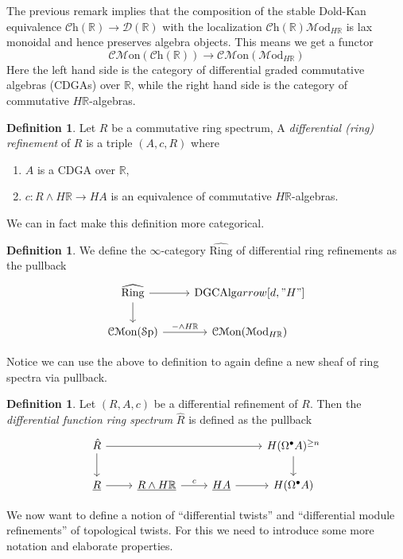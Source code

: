 \documentclass[a4paper]{book}
\newcommand{\lC}{\mathcal{C}}
\newcommand{\lD}{\mathcal{D}}
\newcommand{\lM}{\mathcal{M}}
\newcommand{\bR}{\mathbb{R}}
\newcommand{\lS}{\mathcal{S}}
\newcommand{\Sp}{\lS\mathrm{p}} %
\newcommand{\Mon}{\lM\mathrm{on}} %
\newcommand{\CMon}{\lC\Mon} %
\newcommand{\Ch}{\lC\mathrm{h}} %
\newcommand{\Mod}{\lM\mathrm{od}} %
\theoremstyle{definition}
\newtheorem{definition}[equation]{Definition}
\theoremstyle{remark}
\numberwithin{equation}{section}
\begin{document}
The previous remark implies that the composition of the stable Dold-Kan equivalence $\Ch(\bR) \to \lD(\bR)$ with the localization $\Ch(\bR) \Mod_{H\bR}$ is lax monoidal and hence preserves algebra objects. This means we get a functor
\[\CMon(\Ch(\bR)) \to \CMon(\Mod_{H\bR}) \]
Here the left hand side is the category of differential graded commutative algebras (CDGAs) over $\bR$, while the right hand side is the category of commutative $H\bR$-algebras.

\begin{definition}
  Let $R$ be a commutative ring spectrum, A \emph{differential (ring) refinement} of $R$ is a triple $(A, c, R)$ where
  \begin{enumerate}
    \item $A$ is a CDGA over $\bR$,
    \item $c\colon R \wedge H\bR \to HA$ is an equivalence of commutative $H\bR$-algebras.
  \end{enumerate}
\end{definition}

We can in fact make this definition more categorical.

\begin{definition}
  We define the $\infty$-category $\widehat{\mathrm{Ring}}$ of differential ring refinements as the pullback
  \[
  \begin{tikzcd}
    \widehat{\mathrm{Ring}} \arrow[r] \arrow[d] & \mathrm{DGCAlg} arrow[d, "H"] \\
    \CMon(\Sp) \arrow[r, " - \wedge H\bR"] & \CMon(\Mod_{H\bR})
  \end{tikzcd}
  \]
\end{definition}

Notice we can use the above to definition to again define a new sheaf of ring spectra via pullback.

\begin{definition}
  Let $(R,A,c)$ be a differential refinement of $R$. Then the \emph{differential function ring spectrum} $\hat{R}$ is defined as the pullback
  \[
  \begin{tikzcd}
    \hat{R} \arrow[d] \arrow[rrr] & & & H(\Omega^\bullet A)^{\geq n} \arrow[d] \\ 
    \underline{R} \arrow[r] & \underline{R \wedge H\bR} \arrow[r, "c"] & \underline{HA} \arrow[r] & H(\Omega^\bullet A)
  \end{tikzcd}
  \]
\end{definition}

We now want to define a notion of ``differential twists'' and ``differential module refinements'' of topological twists. For this we need to introduce some more notation and elaborate properties.
\end{document}
